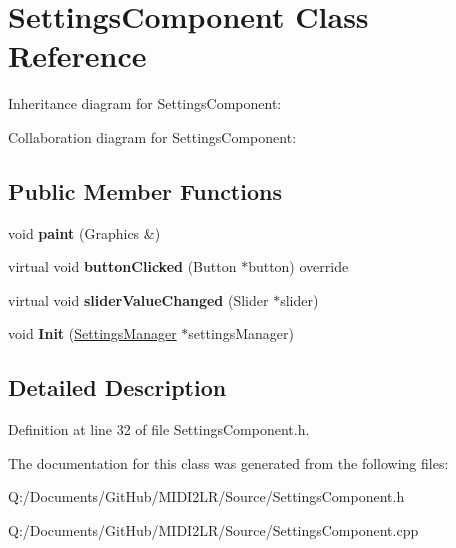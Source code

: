 \hypertarget{class_settings_component}{}\section{Settings\+Component Class Reference}
\label{class_settings_component}


Inheritance diagram for Settings\+Component\+:


Collaboration diagram for Settings\+Component\+:
\subsection*{Public Member Functions}
\begin{DoxyCompactItemize}
\item 
void {\bfseries paint} (Graphics \&)\hypertarget{class_settings_component_adac9fbbad0a4a9908008fd6ed49ee1e6}{}\label{class_settings_component_adac9fbbad0a4a9908008fd6ed49ee1e6}

\item 
virtual void {\bfseries button\+Clicked} (Button $\ast$button) override\hypertarget{class_settings_component_ad65a9529807a9ff304ba994399f55c55}{}\label{class_settings_component_ad65a9529807a9ff304ba994399f55c55}

\item 
virtual void {\bfseries slider\+Value\+Changed} (Slider $\ast$slider)\hypertarget{class_settings_component_a002bd22ab485b7179d4283bf325b6186}{}\label{class_settings_component_a002bd22ab485b7179d4283bf325b6186}

\item 
void {\bfseries Init} (\hyperlink{class_settings_manager}{Settings\+Manager} $\ast$settings\+Manager)\hypertarget{class_settings_component_a079ae41c21da9e0b617d91516e31a9f9}{}\label{class_settings_component_a079ae41c21da9e0b617d91516e31a9f9}

\end{DoxyCompactItemize}


\subsection{Detailed Description}


Definition at line 32 of file Settings\+Component.\+h.



The documentation for this class was generated from the following files\+:\begin{DoxyCompactItemize}
\item 
Q\+:/\+Documents/\+Git\+Hub/\+M\+I\+D\+I2\+L\+R/\+Source/Settings\+Component.\+h\item 
Q\+:/\+Documents/\+Git\+Hub/\+M\+I\+D\+I2\+L\+R/\+Source/Settings\+Component.\+cpp\end{DoxyCompactItemize}
